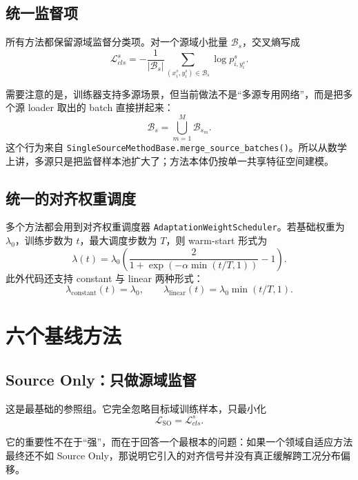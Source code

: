 \documentclass[12pt,a4paper]{ctexart}
\newcommand{\B}{\mathcal{B}}
\begin{document}
\subsection{统一监督项}

所有方法都保留源域监督分类项。对一个源域小批量 $\B_s$，交叉熵写成
\begin{equation}
\mathcal{L}_{cls}^s
=
-\frac{1}{|\B_s|}
\sum_{(x_i^s,y_i^s)\in \B_s}
\log p_{i,y_i^s}^s.
\end{equation}

需要注意的是，训练器支持多源场景，但当前做法不是“多源专用网络”，而是把多个源 loader 取出的 batch 直接拼起来：
\begin{equation}
\B_s = \bigcup_{m=1}^{M}\B_{s_m}.
\end{equation}
这个行为来自 \texttt{SingleSourceMethodBase.merge\_source\_batches()}。所以从数学上讲，多源只是把监督样本池扩大了；方法本体仍按单一共享特征空间建模。

\subsection{统一的对齐权重调度}

多个方法都会用到对齐权重调度器 \texttt{AdaptationWeightScheduler}。若基础权重为 $\lambda_0$，训练步数为 $t$，最大调度步数为 $T$，则 warm-start 形式为
\begin{equation}
\lambda(t)=\lambda_0\left(\frac{2}{1+\exp(-\alpha\min(t/T,1))}-1\right).
\end{equation}
此外代码还支持 constant 与 linear 两种形式：
\begin{equation}
\lambda_{\mathrm{constant}}(t)=\lambda_0,
\qquad
\lambda_{\mathrm{linear}}(t)=\lambda_0\min(t/T,1).
\end{equation}

\section{六个基线方法}

\subsection{Source Only：只做源域监督}

这是最基础的参照组。它完全忽略目标域训练样本，只最小化
\begin{equation}
\mathcal{L}_{\mathrm{SO}}=\mathcal{L}_{cls}^s.
\end{equation}

它的重要性不在于“强”，而在于回答一个最根本的问题：如果一个领域自适应方法最终还不如 Source Only，那说明它引入的对齐信号并没有真正缓解跨工况分布偏移。
\end{document}
